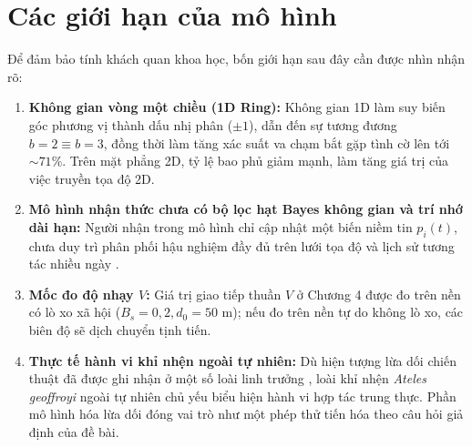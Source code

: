 \documentclass[11pt,a4paper]{report}
\begin{document}
\section{Các giới hạn của mô hình}
\begin{phanbien}
Để đảm bảo tính khách quan khoa học, bốn giới hạn sau đây cần được nhìn nhận rõ:
\begin{enumerate}
  \item \textbf{Không gian vòng một chiều (1D Ring):} Không gian 1D làm suy biến góc phương vị thành dấu nhị phân ($\pm 1$), dẫn đến sự tương đương $b=2 \equiv b=3$, đồng thời làm tăng xác suất va chạm bắt gặp tình cờ lên tới $\sim 71\%$. Trên mặt phẳng 2D, tỷ lệ bao phủ giảm mạnh, làm tăng giá trị của việc truyền tọa độ 2D.
  \item \textbf{Mô hình nhận thức chưa có bộ lọc hạt Bayes không gian và trí nhớ dài hạn:} Người nhận trong mô hình chỉ cập nhật một biến niềm tin $p_i(t)$, chưa duy trì phân phối hậu nghiệm đầy đủ trên lưới tọa độ và lịch sử tương tác nhiều ngày \cite{falcon}.
  \item \textbf{Mốc đo độ nhạy $V$:} Giá trị giao tiếp thuần $V$ ở Chương 4 được đo trên nền có lò xo xã hội ($B_s = 0{,}2, d_0 = 50\text{ m}$); nếu đo trên nền tự do không lò xo, các biên độ sẽ dịch chuyển tịnh tiến.
  \item \textbf{Thực tế hành vi khỉ nhện ngoài tự nhiên:} Dù hiện tượng lừa dối chiến thuật đã được ghi nhận ở một số loài linh trưởng \cite{wheeler}, loài khỉ nhện \textit{Ateles geoffroyi} ngoài tự nhiên chủ yếu biểu hiện hành vi hợp tác trung thực. Phần mô hình hóa lừa dối đóng vai trò như một phép thử tiến hóa theo câu hỏi giả định của đề bài.
\end{enumerate}
\end{phanbien}
\end{document}
